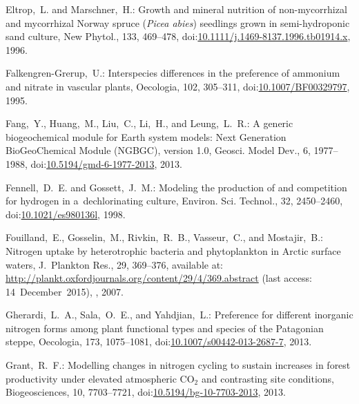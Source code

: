 \documentclass[gmdd, online, hvmath]{copernicus}
\begin{document}
\begin{thebibliography}{55}
Eltrop,~L. and Marschner,~H.:
Growth and mineral nutrition of non-mycorrhizal and mycorrhizal Norway spruce (\textit{Picea abies}) seedlings grown in semi-hydroponic sand culture,
New Phytol.,
133, 469--478,
doi:\href{http://dx.doi.org/10.1111/j.1469-8137.1996.tb01914.x}{10.1111/j.1469-8137.1996.tb01914.x}, 1996.


Falkengren-Grerup,~U.:
Interspecies differences in the preference of ammonium and nitrate in vascular plants,
Oecologia,
102, 305--311,
doi:\href{http://dx.doi.org/10.1007/BF00329797}{10.1007/BF00329797}, 1995.




Fang,~Y., Huang,~M., Liu,~C., Li,~H., and Leung,~L.~R.: A generic biogeochemical module for Earth system models:  Next Generation BioGeoChemical Module (NGBGC), version 1.0, Geosci. Model Dev., 6, 1977--1988,
doi:\href{http://dx.doi.org/10.5194/gmd-6-1977-2013}{10.5194/gmd-6-1977-2013}, 2013.




Fennell,~D.~E. and Gossett,~J.~M.:
Modeling the production of and competition for hydrogen in a~dechlorinating culture,
Environ. Sci. Technol.,
32, 2450--2460,
doi:\href{http://dx.doi.org/10.1021/es980136l}{10.1021/es980136l}, 1998.


Fouilland,~E., Gosselin,~M., Rivkin,~R.~B., Vasseur,~C., and Mostajir,~B.:
Nitrogen uptake by heterotrophic bacteria and phytoplankton in Arctic surface waters,
J.~Plankton Res.,
29, 369--376,
available at: \url{http://plankt.oxfordjournals.org/content/29/4/369.abstract} (last access: 14~December~2015), , 2007.


Gherardi,~L.~A., Sala,~O.~E., and Yahdjian,~L.:
Preference for different inorganic nitrogen forms among plant functional types and species of the Patagonian steppe,
Oecologia,
173, 1075--1081,
doi:\href{http://dx.doi.org/10.1007/s00442-013-2687-7}{10.1007/s00442-013-2687-7}, 2013.



Grant,~R.~F.: Modelling changes in nitrogen cycling to sustain increases in forest productivity under elevated atmospheric CO$_{2}$ and contrasting site conditions, Biogeosciences, 10, 7703--7721,
doi:\href{http://dx.doi.org/10.5194/bg-10-7703-2013}{10.5194/bg-10-7703-2013}, 2013.





\end{thebibliography}
\end{document}

